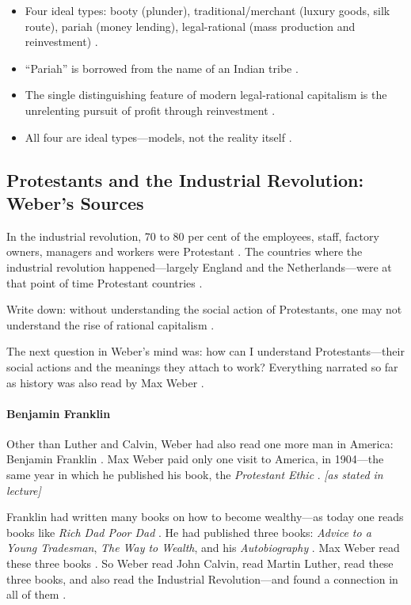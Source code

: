 \begin{QuickRevision}
\begin{itemize}
    \item Four ideal types: booty (plunder), traditional/merchant (luxury goods, silk route), pariah (money lending), legal-rational (mass production and reinvestment) .
    \item ``Pariah'' is borrowed from the name of an Indian tribe .
    \item The single distinguishing feature of modern legal-rational capitalism is the unrelenting pursuit of profit through reinvestment .
    \item All four are ideal types---models, not the reality itself .
\end{itemize}
\end{QuickRevision}

\subsection{Protestants and the Industrial Revolution: Weber's Sources}

\begin{DataFact}
In the industrial revolution, 70 to 80 per cent of the employees, staff, factory owners, managers and workers were Protestant .
The countries where the industrial revolution happened---largely England and the Netherlands---were at that point of time Protestant countries .
\end{DataFact}

\begin{KeyConcept}
Write down: without understanding the social action of Protestants, one may not understand the rise of rational capitalism .
\end{KeyConcept}

The next question in Weber's mind was: how can I understand Protestants---their social actions and the meanings they attach to work? Everything narrated so far as history was also read by Max Weber .

\paragraph{Benjamin Franklin}
Other than Luther and Calvin, Weber had also read one more man in America: Benjamin Franklin . Max Weber paid only one visit to America, in 1904---the same year in which he published his book, the \textit{Protestant Ethic} . \textit{[as stated in lecture]}

Franklin had written many books on how to become wealthy---as today one reads books like \textit{Rich Dad Poor Dad} . He had published three books: \textit{Advice to a Young Tradesman}, \textit{The Way to Wealth}, and his \textit{Autobiography} . Max Weber read these three books .
So Weber read John Calvin, read Martin Luther, read these three books, and also read the Industrial Revolution---and found a connection in all of them .

